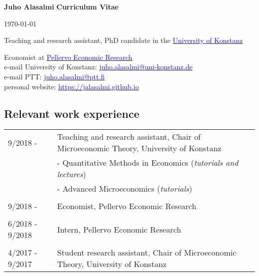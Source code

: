 \documentclass[16pt]{article}
\begin{document}
\noindent \textbf{Juho Alasalmi} \hfill{\textbf{Curriculum Vitae}} \par
\noindent  \hfill{\today} \par
\noindent Teaching and research assistant, PhD candidate in the \href{https://www.wiwi.uni-konstanz.de/goldluecke/team/academic-staff/doctoral-students/}{\textcolor{blue}{University of Konstanz}} \par
\noindent Economist at \href{http://www.ptt.fi/}{\textcolor{blue}{Pellervo Economic Research}} \\

\noindent e-mail University of Konstanz: \href{mailto: juho.alasalmi@uni-konstanz.de}{\textcolor{blue}{juho.alasalmi@uni-konstanz.de}} \\
\noindent e-mail PTT: \href{mailto: juho.alasalmi@ptt.fi}{\textcolor{blue}{juho.alasalmi@ptt.fi}}\\
\noindent personal website: \href{https://jalasalmi.github.io}{\textcolor{blue}{https://jalasalmi.github.io}}

\subsection*{Relevant work experience}
\begin{tabular}{@{}p{1.5in}p{5in}}
9/2018 -            & Teaching and research assistant, Chair of Microeconomic Theory,  University of Konstanz \\
                          &   -  Quantitative Methods in Economics (\textit{tutorials and lectures}) \\
                          &   -  Advanced Microeconomics (\textit{tutorials}) \\   
                                                 
\\
9/2018 -            & Economist, Pellervo Economic Research\\

\\
6/2018 - 9/2018 & Intern, Pellervo Economic Research\\

\\
4/2017 - 9/2017 & Student research assistant, Chair of Microeconomic Theory,  University of Konstanz\\
                           
\end{tabular}
\end{document}
